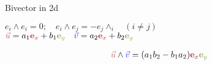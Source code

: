 \begin{frame}[t]{Bivector in 2d}

    \Large
    \begin{center}
        $e_i \wedge e_i = 0; \quad e_i \wedge e_j = - e_j \wedge_i \quad (i \neq j)$ \\
        \vspace{1em}
        $\textcolor{u}{\vec{u}} = a_1 \textcolor{red}{\mathbf{e}_x} + b_1 \textcolor{green}{\mathbf{e}_y}
            \quad
            \textcolor{v}{\vec{v}} = a_2 \textcolor{red}{\mathbf{e}_x} + b_2 \textcolor{green}{\mathbf{e}_y}$
    \end{center}

    \begin{align*}
        \textcolor{u}{\vec{u}} \wedge \textcolor{v}{\vec{v}}
        = (a_1 b_2 - b_1 a_2) \textcolor{red}{\mathbf{e}_{x}} \textcolor{green}{\mathbf{e}_{y}}
    \end{align*}
\end{frame}


